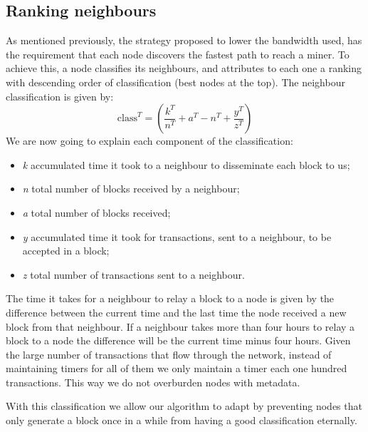 \documentclass{dads}   %
\begin{document}
\subsection{Ranking neighbours}
As mentioned previously, the strategy proposed to lower the bandwidth used, has the requirement that each node discovers the fastest path to reach a miner. 
To achieve this, a node classifies its neighbours, and attributes to each one a ranking with descending order of classification (best nodes at the top). The neighbour classification is given by:
\begin{displaymath} \mbox{class}^{T}= (\dfrac{k^{T}}{n^{T}} + a^{T} - n^{T} + \dfrac{y^{T}}{z^{T}}) \end{displaymath}
We are now going to explain each component of the classification:
\begin{itemize}
  \item \textit{k} accumulated time it took to a neighbour to disseminate each block to us;
  \item \textit{n} total number of blocks received by a neighbour;
  \item \textit{a} total number of blocks received;
  \item \textit{y} accumulated time it took for transactions, sent to a neighbour, to be accepted in a block;
  \item \textit{z} total number of transactions sent to a neighbour.
\end{itemize}

The time it takes for a neighbour to relay a block to a node is given by the difference between the current time and the last time the node received a new block from that neighbour. If a neighbour takes more than four hours to relay a block to a node the difference will be the current time minus four hours. Given the large number of transactions that flow through the network, instead of maintaining timers for all of them we only maintain a timer each one hundred transactions. This way we do not overburden nodes with metadata. 

With this classification we allow our algorithm to adapt by preventing nodes that only generate a block once in a while from having a good classification eternally.
\end{document}
